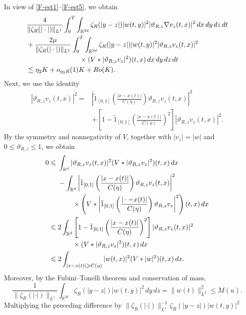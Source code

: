\documentclass[reqno,11pt]{amsart}
\theoremstyle{plain}
\theoremstyle{definition}
\numberwithin{equation}{section}
\numberwithin{theorem}{section}
\def\geq{\geqslant}
\def\leq{\leqslant}
\def\R{\mathbb{R}}
\begin{document}
In view of \eqref{F-est1}--\eqref{F-est5}, we obtain
\begin{align}\label{interme2}
 &\frac4{\|\zeta_R(|\cdot|)\|_{L^1}}
 \int_0^T\int_{\R^{3d}}\zeta_R(|y-z|)|w(t,y)|^2
 |\vartheta_{R,z}\nabla v_z(t,x)|^2\,dx\,dy\,dz\,dt\notag\\
 &+\frac{2\mu}{\|\zeta_R(|\cdot|)\|_{L^1}}
 \int_0^T\int_{\R^{3d}}\zeta_R(|y-z|)|w(t,y)|^2|\vartheta_{R,z}v_z(t,x)|^2\notag\\
 &\hspace{18ex}\times(V*|\vartheta_{R,z}v_z|^2)(t,x)\,dx\,dy\,dz\,dt\notag\\
 &\lesssim\eta_2K+o_{\eta_2R}(1)K+Ro(K).
\end{align}
Next, we use the identity
\begin{align*}
 |\vartheta_{R,z}v_z(t,x)|^2
 ={}&\left|\tilde{1}_{[0,1]}\left(\frac{|x-x(t)|}{C(\eta)}\right)
       \vartheta_{R,z}v_z(t,x)\right|^2\\
 &+\left[1-\tilde{1}_{[0,1]}\left(\frac{|x-x(t)|}{C(\eta)}\right)^2\right]
       |\vartheta_{R,z}v_z(t,x)|^2.
\end{align*}
By the symmetry and nonnegativity of $V$, together with
$|v_z|=|w|$ and $0\leq\vartheta_{R,z}\leq1$, we obtain
\begin{align*}
 0\leq{}&\int_{\R^d}|\vartheta_{R,z}v_z(t,x)|^2
                (V*|\vartheta_{R,z}v_z|^2)(t,x)\,dx\\
 &-\int_{\R^d}\left|\tilde{1}_{[0,1]}\left(\frac{|x-x(t)|}{C(\eta)}\right)
                   \vartheta_{R,z}v_z(t,x)\right|^2\\
 &\hspace{5ex}\times\left(V*\left|\tilde{1}_{[0,1]}
            \left(\frac{|\cdot-x(t)|}{C(\eta)}\right)
            \vartheta_{R,z}v_z\right|^2\right)(t,x)\,dx\\
 \leq{}&2\int_{\R^d}\left[1-\tilde{1}_{[0,1]}
            \left(\frac{|x-x(t)|}{C(\eta)}\right)^2\right]
            |\vartheta_{R,z}v_z(t,x)|^2\\
 &\hspace{5ex}\times(V*|\vartheta_{R,z}v_z|^2)(t,x)\,dx\\
 \leq{}&2\int_{|x-x(t)|\geq C(\eta)}
           |w(t,x)|^2(V*|w|^2)(t,x)\,dx.
\end{align*}
Moreover, by the Fubini--Tonelli theorem and conservation of mass,
\[
 \frac1{\|\zeta_R(|\cdot|)\|_{L^1}}
 \int_{\R^{2d}}\zeta_R(|y-z|)|w(t,y)|^2\,dy\,dz
 =\|w(t)\|_{L^2}^2\leq M(u).
\]
Multiplying the preceding difference by
$\|\zeta_R(|\cdot|)\|_{L^1}^{-1}\zeta_R(|y-z|)|w(t,y)|^2$
\end{document}

